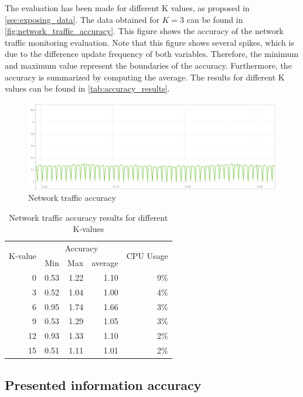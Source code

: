 \noindent
The evaluation has been made for different K values, as proposed in \autoref{sec:exposing_data}. The data obtained for $K = 3$ can be found in \autoref{fig:network_traffic_accuracy}. This figure shows the accuracy of the network traffic monitoring evaluation. Note that this figure shows several spikes, which is due to the difference update frequency of 
both variables. Therefore, the minimum and maximum value represent the boundaries of the accuracy. Furthermore, the accuracy is summarized by computing the average. The results for different K values can be found in \autoref{tab:accuracy_results}.

\begin{figure}
    \centering
    \includegraphics[width=\textwidth]{gfx/traffic_network_accuracy}
    \caption{Network traffic accuracy}
    \label{fig:network_traffic_accuracy}
\end{figure}

\begin{table}[ht]
    \centering
    \begin{tabular}{r|rrr|r}
        \multirow{2}{*}{K-value} & \multicolumn{3}{c|}{Accuracy} & \multirow{2}{*}{CPU Usage} \\
        & Min & Max & average & \\ \hline        
        0 & 0.53& 1.22& 1.10& 9\% \\
        3 & 0.52& 1.04& 1.00& 4\% \\
        6 & 0.95& 1.74& 1.66& 3\% \\
        9 & 0.53& 1.29& 1.05& 3\% \\
        12& 0.93& 1.33& 1.10& 2\% \\
        15& 0.51& 1.11& 1.01& 2\% \\        
    \end{tabular}
    \caption{Network traffic accuracy results for different K-values}
    \label{tab:accuracy_results}
\end{table}

\subsection{Presented information accuracy}

